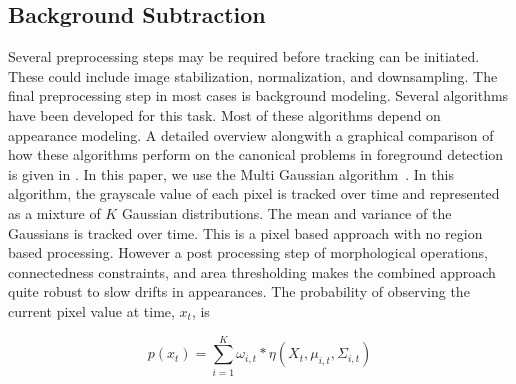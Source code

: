 \documentclass{article}
\begin{document}

\subsection{Background Subtraction}
Several preprocessing steps may be required before tracking can be initiated.  These could include image stabilization, normalization, and downsampling.  The final preprocessing step in most cases is background modeling.  Several algorithms have been developed for this task.  Most of these algorithms depend on appearance modeling.  A detailed overview alongwith a graphical comparison of how these algorithms perform on the canonical problems in foreground detection is given in \cite{1999_CNF_Wallflower_Toyama}.  In this paper, we use the Multi Gaussian algorithm~\cite{2000_JNL_MG_Stauffer}.  In this algorithm, the grayscale value of each pixel is tracked over time and represented as a mixture of $K$ Gaussian distributions.  The mean and variance of the Gaussians is tracked over time.  This is a pixel based approach with no region based processing.  However a post processing step of morphological operations, connectedness constraints, and area thresholding makes the combined approach quite robust to slow drifts in appearances.  The probability of observing the current pixel value at time, $x_t$, is 

\begin{equation}
p(x_t)=\sum_{i=1}^{K}\omega_{i,t}*\eta(X_t, \mu_{i,t}, \Sigma_{i,t})
\end{equation}
\end{document}
